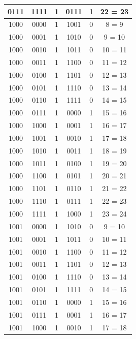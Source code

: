 \documentclass{exam}
\begin{document}
\begin{center}
\begin{longtable}{|c|c|c|c|c|c|}
                0111 & 1111 & 1 & 0111 & 1 & 22 = 23 \\ \hline
                1000 & 0000 & 1 & 1001 & 0 & 8 = 9 \\ \hline
                1000 & 0001 & 1 & 1010 & 0 & 9 = 10 \\ \hline
                1000 & 0010 & 1 & 1011 & 0 & 10 = 11 \\ \hline
                1000 & 0011 & 1 & 1100 & 0 & 11 = 12 \\ \hline
                1000 & 0100 & 1 & 1101 & 0 & 12 = 13 \\ \hline
                1000 & 0101 & 1 & 1110 & 0 & 13 = 14 \\ \hline
                1000 & 0110 & 1 & 1111 & 0 & 14 = 15 \\ \hline
                1000 & 0111 & 1 & 0000 & 1 & 15 = 16 \\ \hline
                1000 & 1000 & 1 & 0001 & 1 & 16 = 17 \\ \hline
                1000 & 1001 & 1 & 0010 & 1 & 17 = 18 \\ \hline
                1000 & 1010 & 1 & 0011 & 1 & 18 = 19 \\ \hline
                1000 & 1011 & 1 & 0100 & 1 & 19 = 20 \\ \hline
                1000 & 1100 & 1 & 0101 & 1 & 20 = 21 \\ \hline
                1000 & 1101 & 1 & 0110 & 1 & 21 = 22 \\ \hline
                1000 & 1110 & 1 & 0111 & 1 & 22 = 23 \\ \hline
                1000 & 1111 & 1 & 1000 & 1 & 23 = 24 \\ \hline
                1001 & 0000 & 1 & 1010 & 0 & 9 = 10 \\ \hline
                1001 & 0001 & 1 & 1011 & 0 & 10 = 11 \\ \hline
                1001 & 0010 & 1 & 1100 & 0 & 11 = 12 \\ \hline
                1001 & 0011 & 1 & 1101 & 0 & 12 = 13 \\ \hline
                1001 & 0100 & 1 & 1110 & 0 & 13 = 14 \\ \hline
                1001 & 0101 & 1 & 1111 & 0 & 14 = 15 \\ \hline
                1001 & 0110 & 1 & 0000 & 1 & 15 = 16 \\ \hline
                1001 & 0111 & 1 & 0001 & 1 & 16 = 17 \\ \hline
                1001 & 1000 & 1 & 0010 & 1 & 17 = 18 \\ \hline

\end{longtable}
\end{center}
\end{document}
